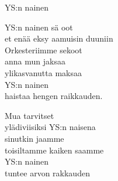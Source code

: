 \begin{song}{YS:n nainen}


    YS:n nainen sä oot\\
    et enää eksy aamuisin duuniin\\
    Orkesteriimme sekoot\\
    anna mun jaksaa\\
    ylikasvanutta maksaa\\
    YS:n nainen\\
    haistaa hengen raikkauden.

    Mua tarvitset\\
    ylädiviisiksi YS:n naisena\\
    sinutkin jaamme\\
    toisiltamme kaiken saamme\\
    YS:n nainen\\
    tuntee arvon rakkauden

\end{song}
